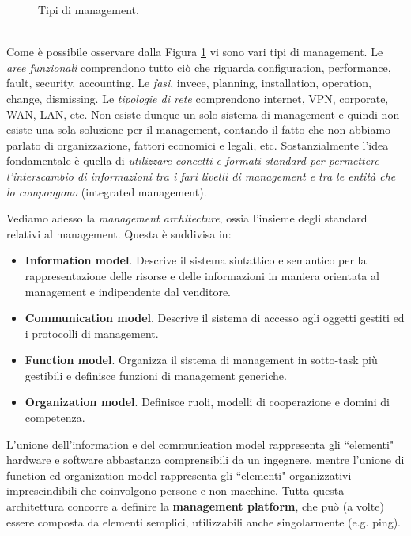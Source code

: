 \begin{figure}[htbp]
	\centering
	\caption{Tipi di management.}
	\label{img:management_types}
\end{figure}\\
Come è possibile osservare dalla Figura \ref{img:management_types} vi sono vari tipi di management. Le \textit{aree funzionali} comprendono tutto ciò che riguarda configuration, performance, fault, security, accounting. Le \textit{fasi}, invece, planning, installation, operation, change, dismissing. Le \textit{tipologie di rete} comprendono internet, VPN, corporate, WAN, LAN, etc. Non esiste dunque un solo sistema di management e quindi non esiste una sola soluzione per il management, contando il fatto che non abbiamo parlato di organizzazione, fattori economici e legali, etc. Sostanzialmente l'idea fondamentale è quella di \textit{utilizzare concetti e formati standard per permettere l'interscambio di informazioni tra i fari livelli di management e tra le entità che lo compongono} (integrated management).

\noindent Vediamo adesso la \textit{management architecture}, ossia l'insieme degli standard relativi al management. Questa è suddivisa in:
\begin{itemize}
	\item \textbf{Information model}. Descrive il sistema sintattico e semantico per la rappresentazione delle risorse e delle informazioni in maniera orientata al management e indipendente dal venditore.
	\item \textbf{Communication model}. Descrive il sistema di accesso agli oggetti gestiti ed i protocolli di management.
	\item \textbf{Function model}. Organizza il sistema di management in sotto-task più gestibili e definisce funzioni di management generiche.
	\item \textbf{Organization model}. Definisce ruoli, modelli di cooperazione e domini di competenza.
\end{itemize}
L'unione dell'information e del communication model rappresenta gli \textquotedblleft elementi" hardware e software abbastanza comprensibili da un ingegnere, mentre l'unione di function ed organization model rappresenta gli \textquotedblleft elementi" organizzativi imprescindibili che coinvolgono persone e non macchine. Tutta questa architettura concorre a definire la \textbf{management platform}, che può (a volte) essere composta da elementi semplici, utilizzabili anche singolarmente (e.g. ping).

